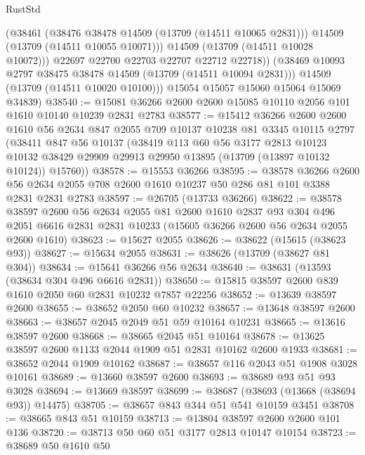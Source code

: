 \begin{lexlean}{RustStd}
\begin{coremodule}
              (@38461
                (@38476 @38478 @14509 (@13709 (@14511 @10065 @2831)))
                @14509
                (@13709 (@14511 @10055 @10071)))
              @14509
              (@13709 (@14511 @10028 @10072)))
            @22697
            @22700
            @22703
            @22707
            @22712
            @22718))
        (@38469 @10093 @2797 @38475 @38478 @14509 (@13709 (@14511 @10094 @2831)))
        @14509
        (@13709 (@14511 @10020 @10100)))
      @15054
      @15057
      @15060
      @15064
      @15069
      @34839)
@38540 := @15081 @36266 @2600 @2600 @15085 @10110 @2056 @101 @1610 @10140 @10239 @2831 @2783
@38577 := @15412
    @36266
    @2600
    @2600
    @1610
    @56
    @2634
    @847
    @2055
    @709
    @10137
    @10238
    @81
    @3345
    @10115
    @2797
    (@38411
      @847
      @56
      @10137
      (@38419
        @113
        @60
        @56
        @3177
        @2813
        @10123
        @10132
        @38429
        @29909
        @29913
        @29950
        @13895
        (@13709 (@13897 @10132 @10124))
        @15760))
@38578 := @15553 @36266
@38595 := @38578
    @36266
    @2600
    @56
    @2634
    @2055
    @708
    @2600
    @1610
    @10237
    @50
    @286
    @81
    @101
    @3388
    @2831
    @2831
    @2783
@38597 := @26705 (@13733 @36266)
@38622 := @38578
    @38597
    @2600
    @56
    @2634
    @2055
    @81
    @2600
    @1610
    @2837
    @93
    @304
    @496
    @2051
    @6616
    @2831
    @2831
    @10233
    (@15605 @36266 @2600 @56 @2634 @2055 @2600 @1610)
@38623 := @15627 @2055
@38626 := @38622 (@15615 (@38623 @93))
@38627 := @15634 @2055
@38631 := @38626 (@13709 (@38627 @81 @304))
@38634 := @15641 @36266 @56 @2634
@38640 := @38631 (@13593 (@38634 @304 @496 @6616 @2831))
@38650 := @15815 @38597 @2600 @839 @1610 @2050 @60 @2831 @10232 @7857 @22256
@38652 := @13639 @38597 @2600
@38655 := @38652 @2050 @60 @10232
@38657 := @13648 @38597 @2600
@38663 := @38657 @2045 @2049 @51 @59 @10164 @10231
@38665 := @13616 @38597 @2600
@38668 := @38665 @2045 @51 @10164
@38678 := @13625 @38597 @2600 @1133 @2044 @1909 @51 @2831 @10162 @2600 @1933
@38681 := @38652 @2044 @1909 @10162
@38687 := @38657 @116 @2043 @51 @1908 @3028 @10161
@38689 := @13660 @38597 @2600
@38693 := @38689 @93 @51 @93 @3028
@38694 := @13669 @38597
@38699 := @38687 (@38693 (@13668 (@38694 @93)) @14475)
@38705 := @38657 @843 @344 @51 @541 @10159 @3451
@38708 := @38665 @843 @51 @10159
@38713 := @13804 @38597 @2600 @2600 @101 @136
@38720 := @38713 @50 @60 @51 @3177 @2813 @10147 @10154
@38723 := @38689 @50 @1610 @50

\end{coremodule}
\end{lexlean}

